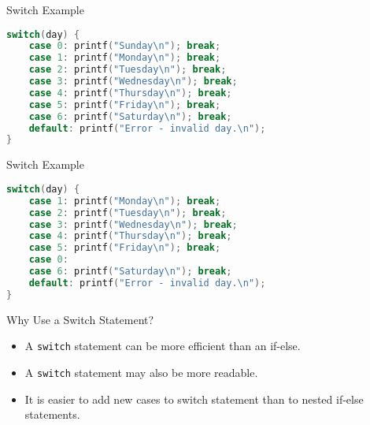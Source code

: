 \documentclass[graphics]{beamer}
\begin{document}
\begin{frame}[fragile]{Switch Example}
    \begin{lstlisting}[language=C,basicstyle=\footnotesize,keywordstyle=\color{blue},commentstyle=\color{green},showstringspaces=false,stringstyle=\color{red}]
switch(day) {
    case 0: printf("Sunday\n"); break;
    case 1: printf("Monday\n"); break;
    case 2: printf("Tuesday\n"); break;
    case 3: printf("Wednesday\n"); break;
    case 4: printf("Thursday\n"); break;
    case 5: printf("Friday\n"); break;
    case 6: printf("Saturday\n"); break;
    default: printf("Error - invalid day.\n");
}
\end{lstlisting}
\end{frame}

\begin{frame}[fragile]{Switch Example}
    \begin{lstlisting}[language=C,basicstyle=\footnotesize,keywordstyle=\color{blue},commentstyle=\color{green},showstringspaces=false,stringstyle=\color{red}]
switch(day) {
    case 1: printf("Monday\n"); break;
    case 2: printf("Tuesday\n"); break;
    case 3: printf("Wednesday\n"); break;
    case 4: printf("Thursday\n"); break;
    case 5: printf("Friday\n"); break;
    case 0:
    case 6: printf("Saturday\n"); break;
    default: printf("Error - invalid day.\n");
}
\end{lstlisting}
\end{frame}

\begin{frame}{Why Use a Switch Statement?}
    \begin{itemize}
        \item A \texttt{switch} statement can be more efficient than an if-else.
        \item A \texttt{switch} statement may also be more readable.
        \item It is easier to add new cases to switch statement than to nested if-else statements.
    \end{itemize}
\end{frame}
\end{document}
